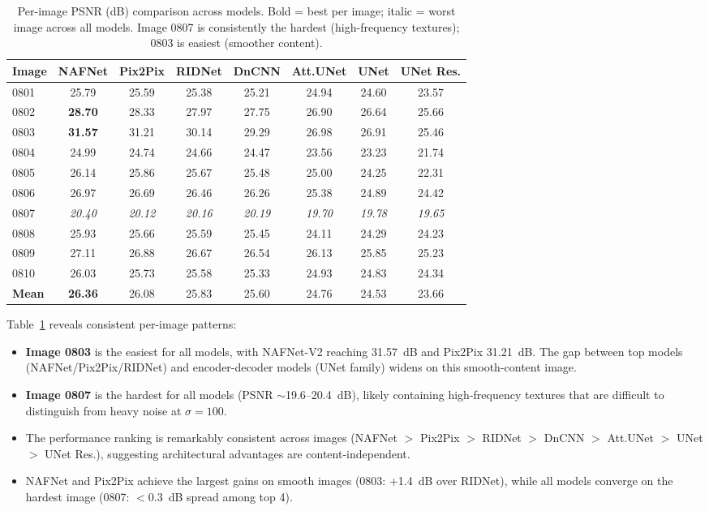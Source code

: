 \begin{table}[t]
\centering
\small
\setlength{\tabcolsep}{2.5pt}
\begin{tabular}{lccccccc}
\toprule
\textbf{Image} & \textbf{NAFNet} & \textbf{Pix2Pix} & \textbf{RIDNet} & \textbf{DnCNN} & \textbf{Att.UNet} & \textbf{UNet} & \textbf{UNet Res.} \\
\midrule
0801 & 25.79 & 25.59 & 25.38 & 25.21 & 24.94 & 24.60 & 23.57 \\
0802 & \textbf{28.70} & 28.33 & 27.97 & 27.75 & 26.90 & 26.64 & 25.66 \\
0803 & \textbf{31.57} & 31.21 & 30.14 & 29.29 & 26.98 & 26.91 & 25.46 \\
0804 & 24.99 & 24.74 & 24.66 & 24.47 & 23.56 & 23.23 & 21.74 \\
0805 & 26.14 & 25.86 & 25.67 & 25.48 & 25.00 & 24.25 & 22.31 \\
0806 & 26.97 & 26.69 & 26.46 & 26.26 & 25.38 & 24.89 & 24.42 \\
0807 & \textit{20.40} & \textit{20.12} & \textit{20.16} & \textit{20.19} & \textit{19.70} & \textit{19.78} & \textit{19.65} \\
0808 & 25.93 & 25.66 & 25.59 & 25.45 & 24.11 & 24.29 & 24.23 \\
0809 & 27.11 & 26.88 & 26.67 & 26.54 & 26.13 & 25.85 & 25.23 \\
0810 & 26.03 & 25.73 & 25.58 & 25.33 & 24.93 & 24.83 & 24.34 \\
\midrule
\textbf{Mean} & \textbf{26.36} & 26.08 & 25.83 & 25.60 & 24.76 & 24.53 & 23.66 \\
\bottomrule
\end{tabular}
\caption{Per-image PSNR (dB) comparison across models. Bold = best per image; italic = worst image across all models. Image 0807 is consistently the hardest (high-frequency textures); 0803 is easiest (smoother content).}
\label{tab:per_image}
\end{table}

Table~\ref{tab:per_image} reveals consistent per-image patterns:
\begin{itemize}
    \item \textbf{Image 0803} is the easiest for all models, with NAFNet-V2 reaching 31.57~dB and Pix2Pix 31.21~dB. The gap between top models (NAFNet/Pix2Pix/RIDNet) and encoder-decoder models (UNet family) widens on this smooth-content image.
    \item \textbf{Image 0807} is the hardest for all models (PSNR $\sim$19.6--20.4~dB), likely containing high-frequency textures that are difficult to distinguish from heavy noise at $\sigma = 100$.
    \item The performance ranking is remarkably consistent across images (NAFNet $>$ Pix2Pix $>$ RIDNet $>$ DnCNN $>$ Att.UNet $>$ UNet $>$ UNet Res.), suggesting architectural advantages are content-independent.
    \item NAFNet and Pix2Pix achieve the largest gains on smooth images (0803: +1.4~dB over RIDNet), while all models converge on the hardest image (0807: $<$0.3~dB spread among top 4).
\end{itemize}



